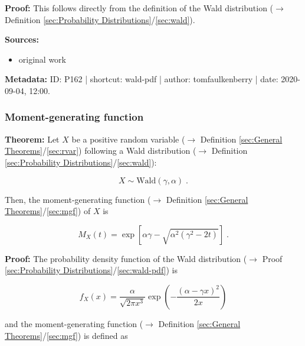 \documentclass[a4paper,12pt,twoside]{book}
\begin{document}
\vspace{1em}
\textbf{Proof:} This follows directly from the definition of the Wald distribution ($\rightarrow$ Definition \ref{sec:Probability Distributions}/\ref{sec:wald}).


\vspace{1em}
\textbf{Sources:}
\begin{itemize}
\item original work\end{itemize}


\vspace{1em}
\textbf{Metadata:} ID: P162 | shortcut: wald-pdf | author: tomfaulkenberry | date: 2020-09-04, 12:00.
\vspace{1em}



\subsubsection[\textbf{Moment-generating function}]{Moment-generating function} \label{sec:wald-mgf}
\setcounter{equation}{0}

\textbf{Theorem:} Let $X$ be a positive random variable ($\rightarrow$ Definition \ref{sec:General Theorems}/\ref{sec:rvar}) following a Wald distribution ($\rightarrow$ Definition \ref{sec:Probability Distributions}/\ref{sec:wald}):

\begin{equation} \label{eq:wald-mgf-wald}
X \sim \mathrm{Wald}(\gamma, \alpha) \; .
\end{equation}

Then, the moment-generating function ($\rightarrow$ Definition \ref{sec:General Theorems}/\ref{sec:mgf}) of $X$ is

\begin{equation} \label{eq:wald-mgf-wald-mgf}
M_X(t) = \exp \left[ \alpha\gamma-\sqrt{\alpha^2(\gamma^2-2t)}\right] \; .
\end{equation}


\vspace{1em}
\textbf{Proof:} The probability density function of the Wald distribution ($\rightarrow$ Proof \ref{sec:Probability Distributions}/\ref{sec:wald-pdf}) is

\begin{equation} \label{eq:wald-mgf-wald-pdf}
f_X(x) = \frac{\alpha}{\sqrt{2\pi x^3}}\exp\left(-\frac{(\alpha-\gamma x)^2}{2x}\right)
\end{equation}

and the moment-generating function ($\rightarrow$ Definition \ref{sec:General Theorems}/\ref{sec:mgf}) is defined as
\end{document}
